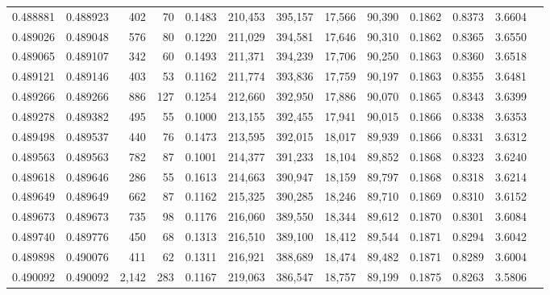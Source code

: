 \begin{tabular}{rrrrrrrrrrrrr}
0.488881 & 0.488923 &   402 &    70 &                                     0.1483 & 210,453 & 395,157 &  17,566 &  90,390 & 0.1862 & 0.8373 & 3.6604 \\
0.489026 & 0.489048 &   576 &    80 &                                     0.1220 & 211,029 & 394,581 &  17,646 &  90,310 & 0.1862 & 0.8365 & 3.6550 \\
0.489065 & 0.489107 &   342 &    60 &                                     0.1493 & 211,371 & 394,239 &  17,706 &  90,250 & 0.1863 & 0.8360 & 3.6518 \\
0.489121 & 0.489146 &   403 &    53 &                                     0.1162 & 211,774 & 393,836 &  17,759 &  90,197 & 0.1863 & 0.8355 & 3.6481 \\
0.489266 & 0.489266 &   886 &   127 &                                     0.1254 & 212,660 & 392,950 &  17,886 &  90,070 & 0.1865 & 0.8343 & 3.6399 \\
0.489278 & 0.489382 &   495 &    55 &                                     0.1000 & 213,155 & 392,455 &  17,941 &  90,015 & 0.1866 & 0.8338 & 3.6353 \\
0.489498 & 0.489537 &   440 &    76 &                                     0.1473 & 213,595 & 392,015 &  18,017 &  89,939 & 0.1866 & 0.8331 & 3.6312 \\
0.489563 & 0.489563 &   782 &    87 &                                     0.1001 & 214,377 & 391,233 &  18,104 &  89,852 & 0.1868 & 0.8323 & 3.6240 \\
0.489618 & 0.489646 &   286 &    55 &                                     0.1613 & 214,663 & 390,947 &  18,159 &  89,797 & 0.1868 & 0.8318 & 3.6214 \\
0.489649 & 0.489649 &   662 &    87 &                                     0.1162 & 215,325 & 390,285 &  18,246 &  89,710 & 0.1869 & 0.8310 & 3.6152 \\
0.489673 & 0.489673 &   735 &    98 &                                     0.1176 & 216,060 & 389,550 &  18,344 &  89,612 & 0.1870 & 0.8301 & 3.6084 \\
0.489740 & 0.489776 &   450 &    68 &                                     0.1313 & 216,510 & 389,100 &  18,412 &  89,544 & 0.1871 & 0.8294 & 3.6042 \\
0.489898 & 0.490076 &   411 &    62 &                                     0.1311 & 216,921 & 388,689 &  18,474 &  89,482 & 0.1871 & 0.8289 & 3.6004 \\
0.490092 & 0.490092 & 2,142 &   283 &                                     0.1167 & 219,063 & 386,547 &  18,757 &  89,199 & 0.1875 & 0.8263 & 3.5806 \\

\end{tabular}
